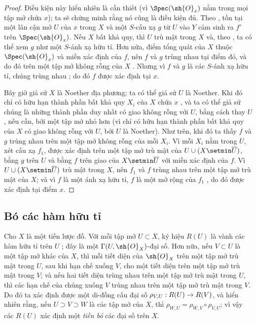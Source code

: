 \documentclass[oneside]{amsart}
\makeatletter
\newcommand{\ega@arrow}[2]{\mathchoice{#1}{#2}{#2}{#2}}
\renewcommand{\to}{\ega@arrow{\longrightarrow}{\rightarrow}}
\let\EGAOriginalLabel\label
\renewcommand{\label}[1]{\phantomsection\EGAOriginalLabel{#1}}
\makeatother
\begin{document}
\begin{proof}
Điều kiện này hiển nhiên là cần thiết (vì $\Spec(\sh{O}_x)$ nằm trong mọi tập mở chứa $x$); ta sẽ chứng minh rằng nó cũng là điều kiện đủ.
Theo , tồn tại một lân cận mở $U$ của $x$ trong $X$ và một $S$-cấu xạ $g$ từ $U$ vào $Y$ cảm sinh ra $f'$ trên $\Spec(\sh{O}_x)$.
Nếu $X$ bất khả quy, thì $U$ trù mật trong $X$ và, theo , ta có thể xem $g$ như một $S$-ánh xạ hữu tỉ.
Hơn nữa, điểm tổng quát của $X$ thuộc $\Spec(\sh{O}_x)$ và miền xác định của $f$, nên $f$ và $g$ trùng nhau tại điểm đó, và do đó trên một tập mở không rỗng của $X$ .
Nhưng vì $f$ và $g$ là các $S$-ánh xạ hữu tỉ, chúng trùng nhau ; do đó $f$ được xác định tại $x$.

Bây giờ giả sử $X$ là Noether địa phương; ta có thể giả sử $U$ là Noether.
Khi đó chỉ có hữu hạn thành phần bất khả quy $X_i$ của $X$ chứa $x$ , và ta có thể giả sử chúng là những thành phần duy nhất có giao không rỗng với $U$, bằng cách thay $U$, nếu cần, bởi một tập mở nhỏ hơn (vì chỉ có hữu hạn thành phần bất khả quy của $X$ có giao không rỗng với $U$, bởi $U$ là Noether).
Như trên, khi đó ta thấy $f$ và $g$ trùng nhau trên một tập mở không rỗng của mỗi $X_i$.
Vì mỗi $X_i$ nằm trong $\overline{U}$, xét cấu xạ $f_1$, được xác định trên một tập mở trù mật của $U\cup(X\setmin\overline{U})$, bằng $g$ trên $U$ và bằng $f$ trên giao của $X\setmin\overline{U}$ với miền xác định của $f$.
Vì $U\cup(X\setmin\overline{U})$ trù mật trong $X$, nên $f_1$ và $f$ trùng nhau trên một tập mở trù mật của $X$; và vì $f$ là một ánh xạ hữu tỉ, $f$ là một mở rộng của $f_1$ , do đó được xác định tại điểm $x$.
\end{proof}

\subsection{Bó các hàm hữu tỉ}
\label{subsection:I.7.3}

\begin{env}[7.3.1]
\label{I.7.3.1}
Cho $X$ là một tiền lược đồ.
Với mỗi tập mở $U\subset X$, ký hiệu $R(U)$ là vành các hàm hữu tỉ trên $U$ ; đây là một $\Gamma(U,\sh{O}_X)$-đại số.
Hơn nữa, nếu $V\subset U$ là một tập mở khác của $X$, thì mỗi tiết diện của $\sh{O}_X$ trên một tập mở trù mật trong $U$, sau khi hạn chế xuống $V$, cho một tiết diện trên một tập mở trù mật trong $V$; và nếu hai tiết diện trùng nhau trên một tập mở trù mật trong $U$, thì các hạn chế của chúng xuống $V$ trùng nhau trên một tập mở trù mật trong $V$.
Do đó ta xác định được một di-đồng cấu đại số $\rho_{V,U}:R(U)\to R(V)$, và hiển nhiên rằng, nếu $U\supset V\supset W$ là các tập mở của $X$, thì $\rho_{W,U}=\rho_{W,V}\circ\rho_{V,U}$; vì vậy các $R(U)$ xác định một \emph{tiền bó} các đại số trên $X$.
\end{env}
\end{document}
